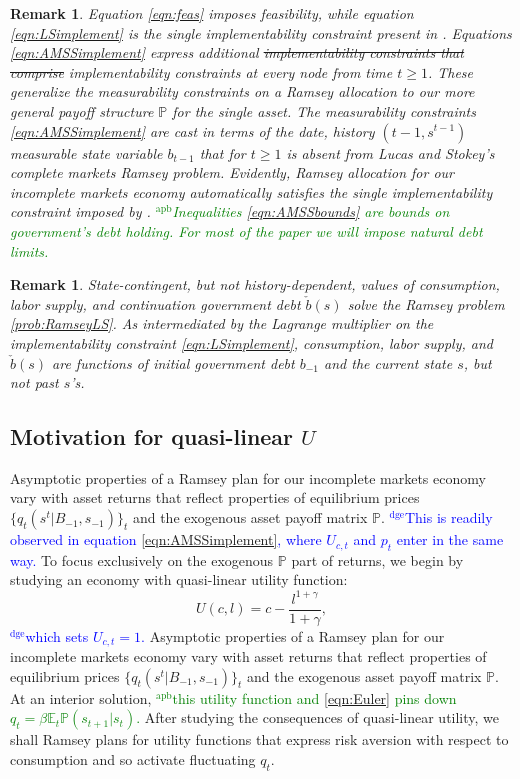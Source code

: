 \documentclass[12pt]{article}
\newcommand{\dge}[1]{\textcolor{blue}{$^{\textrm{dge}}${#1}}}
\newcommand{\apb}[1]{\textcolor{green}{$^{\textrm{apb}}${#1}}}
\newtheorem{remark}[theorem]{Remark}
\begin{document}
\begin{remark} Equation \eqref{eqn:feas} imposes feasibility, while equation  \eqref{eqn:LSimplement} is the single implementability constraint
present in \citet{LucasJr.1983}.  Equations \eqref{eqn:AMSSimplement} express  additional \st{implementability constraints that comprise} implementability constraints at every node from time $t \geq 1$. These generalize the \citet{Aiyagari2002} measurability constraints on a Ramsey allocation  to our more general payoff structure ${\mathbb P}$ for the
single asset. The measurability constraints \eqref{eqn:AMSSimplement}  are cast
in terms of the date, history $(t-1, s^{t-1})$ measurable state variable $b_{t-1}$ that for $t \geq 1$ is absent from Lucas and Stokey's complete markets Ramsey problem.  Evidently, Ramsey allocation for our incomplete markets economy automatically satisfies the single implementability constraint imposed by \citeauthor{LucasJr.1983}. \apb{Inequalities \eqref{eqn:AMSSbounds} are bounds on government's debt holding. For most of the paper we will impose natural debt limits.} 
\end{remark}


\begin{remark}\label{rem:LSdebt}
State-contingent, but not history-dependent,  values of consumption, labor supply, and continuation government debt $\check b(s)$  solve the \citet{LucasJr.1983} Ramsey problem \ref{prob:RamseyLS}.  As intermediated by the Lagrange multiplier on the implementability constraint \eqref{eqn:LSimplement},
consumption, labor supply, and $\check b(s)$ are  functions of initial government debt $b_{-1}$ and the current state $s$, but not past
 $s$'s.
\end{remark}

\subsection{Motivation for  quasi-linear $U$\label{sec:excusequasilinear}}
Asymptotic properties of a Ramsey plan for our incomplete markets economy vary  with   asset returns that reflect
	properties of equilibrium prices $\{q_t(s^t|B_{-1},s_{-1})\}_t$ and the exogenous asset payoff matrix $\mathbb{P}$.  \dge{This is readily observed in equation \eqref{eqn:AMSSimplement}, where $U_{c,t}$ and $p_t$ enter in the same way.} 
To focus exclusively on the exogenous $\mathbb{P}$ part of returns, we begin  by studying an economy with  quasi-linear  utility function:
  \begin{equation}\label{eqn:UQL}
U(c,l)=c-\frac{l^{1+\gamma}}{1+\gamma},\end{equation}\dge{which sets $U_{c,t}= 1$.}  Asymptotic properties of a Ramsey plan for our incomplete markets economy vary  with   asset returns that reflect
	properties of equilibrium prices $\{q_t(s^t|B_{-1},s_{-1})\}_t$ and the exogenous asset payoff matrix $\mathbb{P}$.
At an interior solution, \apb{this utility function and \eqref{eqn:Euler} pins down $q_t=\beta \mathbb{E}_t
\mathbb{P}(s_{t+1}|s_t)$.}  After studying the consequences of quasi-linear utility, we shall Ramsey plans for utility functions that express risk aversion with respect to consumption and so activate fluctuating $q_t$.
	
\end{document}
